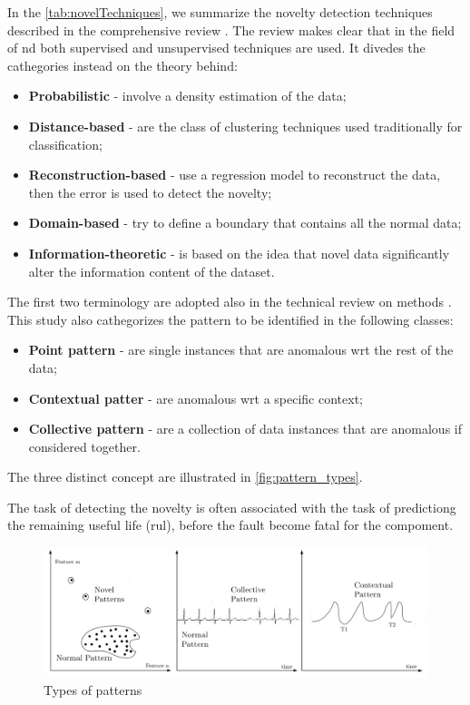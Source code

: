 In the \autoref{tab:novelTechniques}, we summarize the novelty detection techniques described in the comprehensive review \cite{NoveltyReview}. The review makes clear that in the field of \gls{nd} both supervised and unsupervised techniques are used. It divedes  the cathegories instead on the theory behind:
\begin{itemize}
    \item \textbf{Probabilistic} - involve a density estimation of the data;
    \item \textbf{Distance-based} - are the class of clustering techniques used traditionally for classification;
    \item \textbf{Reconstruction-based} - use a regression model to reconstruct the data, then the error is used to detect the novelty;
    \item \textbf{Domain-based} - try to define a boundary that contains all the normal data;
    \item \textbf{Information-theoretic} - is based on the idea that novel data significantly alter the information content of the dataset.
\end{itemize}

{}

The first two terminology are adopted also in the technical review on methods \cite{NoveltyTech}. This study also cathegorizes the pattern to be identified in the following classes:
\begin{itemize}
    \item \textbf{Point pattern} - are single instances that are anomalous \gls{wrt} the rest of the data;
    \item \textbf{Contextual patter} - are anomalous \gls{wrt} a specific context;
    \item \textbf{Collective pattern} - are a collection of data instances that are anomalous if considered together.
\end{itemize}

The three distinct concept are illustrated in \autoref{fig:pattern_types}.

The task of detecting the novelty is often associated with the task of predictiong the remaining useful life (\gls{rul}), before the fault become fatal for the compoment.

\begin{figure}
    \centering
    \includegraphics[width=\textwidth]{images/StateArt/patterns.png}
    \caption{Types of patterns \cite{NoveltyTech}}
    \label{fig:pattern_types}
\end{figure}

